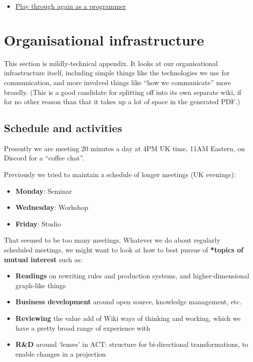 \documentclass[11pt]{article}
\begin{document}
\begin{itemize}
\item \href{0caba40b-2561-4143-b2b1-55f3ddc3201b}{Play through again as a programmer}
\end{itemize}
\section{Organisational infrastructure}
\label{sec:org98b3654}
This section is mildly-technical appendix.  It looks at our
organisational infrastructure itself, including simple things like the
technologies we use for communication, and more involved things like
“how we communicate” more broadly.  (This is a good candidate for
splitting off into its own separate wiki, if for no other reason than
that it takes up a lot of space in the generated PDF.)

\subsection{Schedule and activities}
\label{sec:orgd5d32a3}

Presently we are meeting 20 minutes a day at 4PM UK time, 11AM
Eastern, on Discord for a “coffee chat”.

Previously we tried to maintain a schedule of longer meetings (UK
evenings):

\begin{itemize}
\item \textbf{Monday}: Seminar
\item \textbf{Wednesday}: Workshop
\item \textbf{Friday}: Studio
\end{itemize}

That seemed to be too many meetings.  Whatever we do about regularly
scheduled meetings, we might want to look at how to best pursue of
\textbf{*topics of mutual interest} such as:

\begin{itemize}
\item \textbf{Readings} on rewriting rules and production systems, and higher-dimensional graph-like things
\item \textbf{Business development} around open source, knowledge management, etc.
\item \textbf{Reviewing} the value add of Wiki ways of thinking and working, which we have a pretty broad range of experience with
\item \textbf{R\&D} around ‘lenses’ in ACT: structure for bi-directional transformations, to enable changes in a projection
\end{itemize}
\end{document}
